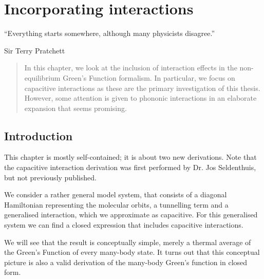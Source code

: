 \chapter{Incorporating interactions}
\label{ch:chapter_3}




\epigraph{
    “Everything starts somewhere, although many physicists disagree.”
}{Sir Terry Pratchett}

\begin{abstract}
In this chapter, we look at the inclusion of interaction effects in the non-equilibrium Green's Function formalism. In particular, we focus on capacitive interactions as these are the primary investigation of this thesis. However, some attention is given to phononic interactions in an elaborate expansion that seems promising.
\end{abstract}

\newpage
\section{Introduction}
This chapter is mostly self-contained; it is about two new derivations. Note that the capacitive interaction derivation was first performed by Dr. Jos Seldenthuis, but not previously published.

We consider a rather general model system, that consists of a diagonal Hamiltonian representing the molecular orbits, a tunnelling term and a generalised interaction, which we approximate as capacitive. For this generalised system we can find a closed expression that includes capacitive interactions.

We will see that the result is conceptually simple, merely a thermal average of the Green's Function of every many-body state. It turns out that this conceptual picture is also a valid derivation of the many-body Green's function in closed form.

